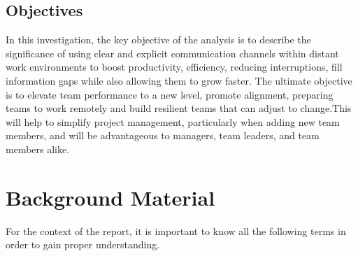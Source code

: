\documentclass{llncs}
\begin{document}
\subsection{Objectives}
In this investigation, the key objective of the analysis is to describe the significance of using clear and explicit communication channels within distant work environments to boost productivity, efficiency, reducing interruptions, fill information gaps while also allowing them to grow faster. The ultimate objective is to elevate team performance to a new level, promote alignment, preparing teams to work remotely and build resilient teams that can adjust to change.This will help to simplify project management, particularly when adding new team members, and will be advantageous to managers, team leaders, and team members alike. ~\cite{refbook1} 

\section{Background Material}
For the context of the report, it is important to know all the following terms in order to gain proper understanding.
\end{document}

